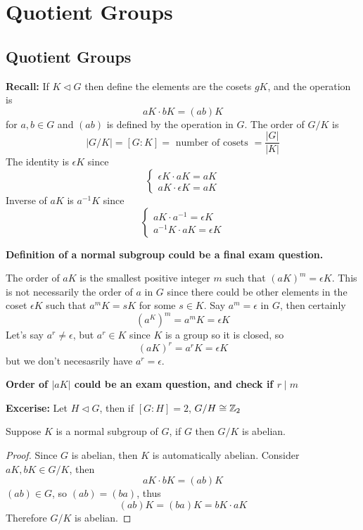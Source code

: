 \documentclass[openany]{report}
\begin{document}
\chapter{Quotient Groups}
\section{Quotient Groups}
\textbf{Recall:} If $K \triangleleft G$ then define the  elements are the cosets $gK$, and the operation is 
\[aK \cdot bK = (ab) K\]
for $a,b \in G$ and $(ab)$ is defined by the operation in $G$. The order of $G / K$ is
\[|G/K| = [G : K] = \text{ number of cosets } = \frac{|G|}{|K|}\]
The identity is $\epsilon K$ since 
\[\begin{cases}
    \epsilon K \cdot aK = aK\\
    aK \cdot \epsilon K = aK
\end{cases}\]
Inverse of $aK$ is $a^{-1}K$ since 
\[\begin{cases}
    aK \cdot a^{-1} = \epsilon K \\
    a^{-1}K \cdot aK = \epsilon K
\end{cases}\]
\begin{center}
    \textbf{ Definition of a normal subgroup could be a final exam question.}
\end{center}

The order of $aK$ is the smallest positive integer $m$ such that $(aK)^m = \epsilon K$. This is not necessarily the order of $a$ in $G$ since there could be other elements in the coset $\epsilon K$ such that $a^m K = s K$ for some $s \in K$. Say $a^m = \epsilon$ in $G$, then certainly 
\[(a^K)^m = a^m K = \epsilon K\]
 Let's say $a^r \neq \epsilon$, but $a^r \in K$ since $K$ is a group so it is closed, so 
\[(aK)^r = a^rK = \epsilon K\]
but we don't necesasrily have $a^r = \epsilon$. 
\begin{center}
    \textbf{ Order of $|aK|$ could be an exam question, and check if $r \mid m$}
\end{center}
\textbf{Excerise:} Let $H \triangleleft G$, then if $[G : H] = 2$, $G/H \cong \mathbb{Z}_2$ 
\begin{prop}
    Suppose $K$ is a normal subgroup of $G$, if $G$ then $G/K$ is abelian.
\end{prop}
\begin{proof}
    Since $G$ is abelian, then $K$ is automatically abelian. Consider $aK, bK \in G/K$, then 
    \[aK \cdot bK = (ab)K\]
    $(ab) \in G$, so $(ab) = (ba)$, thus 
    \[(ab)K = (ba)K = bK \cdot a K\]
    Therefore $G / K$ is abelian.
\end{proof}
\end{document}
